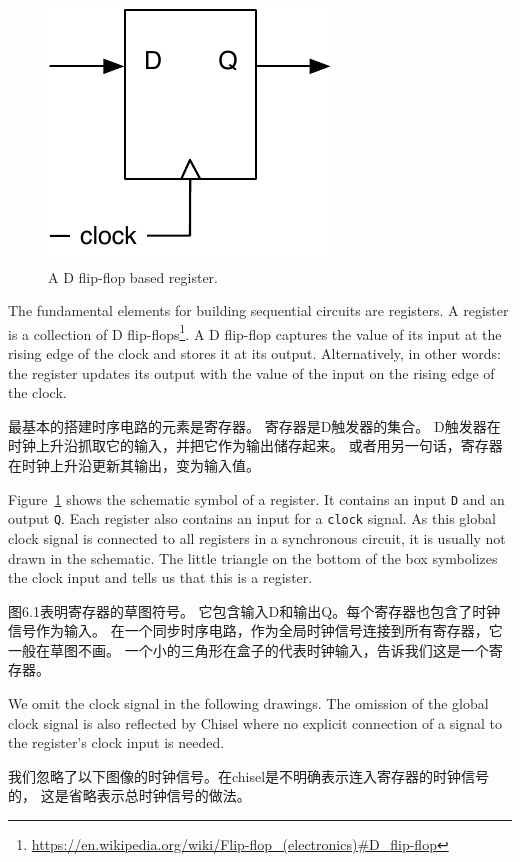\documentclass[%
    10pt,
    headinclude, footexclude,
    openright, %
    notitlepage,
    cleardoubleempty,
    headsepline,
    pointlessnumbers,
    bibtotoc, idxtotoc,
    ]{scrbook}
\newcommand{\code}[1]{{\small{\texttt{#1}}}}
\newcommand{\scale}{0.7}
\newcommand{\myref}[2]{\href{#1}{#2}}
\renewcommand{\myref}[2]{{#2}{\footnote{\url{#1}}}}
\begin{document}
\begin{figure}
  \centering
  \includegraphics[scale=\scale]{figures/register}
  \caption{A D flip-flop based register.}
  \label{fig:register}
\end{figure}

The fundamental elements for building sequential circuits are registers. A register is a collection
of \myref{https://en.wikipedia.org/wiki/Flip-flop_(electronics)\#D_flip-flop}{D flip-flops}.
A D flip-flop captures the value of its input at the rising edge of the clock and stores
it at its output. Alternatively, in other words: the register updates its output with the value of the input on the rising edge of the clock.

最基本的搭建时序电路的元素是寄存器。
寄存器是D触发器的集合。
D触发器在时钟上升沿抓取它的输入，并把它作为输出储存起来。
或者用另一句话，寄存器在时钟上升沿更新其输出，变为输入值。

Figure~\ref{fig:register} shows the schematic symbol of a register. It contains an input
\code{D} and an output \code{Q}. Each register also contains an input for a \code{clock} signal.
As this global clock signal is connected to all registers in a synchronous circuit, it is usually
not drawn in the schematic. The little triangle on the bottom of the box symbolizes the
clock input and tells us that this is a register.

图6.1表明寄存器的草图符号。
它包含输入D和输出Q。每个寄存器也包含了时钟信号作为输入。
在一个同步时序电路，作为全局时钟信号连接到所有寄存器，它一般在草图不画。
一个小的三角形在盒子的代表时钟输入，告诉我们这是一个寄存器。

We omit the clock signal in the following
drawings. The omission of the global clock signal is also reflected by Chisel where no explicit
connection of a signal to the register's clock input is needed.

我们忽略了以下图像的时钟信号。在chisel是不明确表示连入寄存器的时钟信号的，
这是省略表示总时钟信号的做法。
\end{document}
